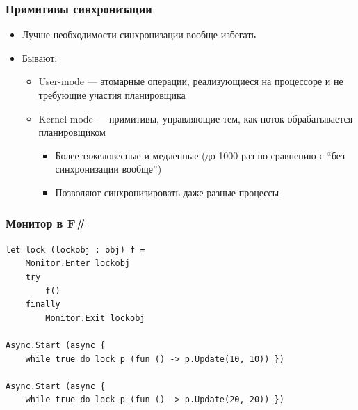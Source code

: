 \documentclass[xetex,mathserif,serif]{beamer}
\begin{document}
	\begin{frame}
		\frametitle{Примитивы синхронизации}
		\begin{itemize}
			\item Лучше необходимости синхронизации вообще избегать
			\item Бывают:
			\begin{itemize}
				\item User-mode --- атомарные операции, реализующиеся на процессоре и не требующие участия планировщика
				\item Kernel-mode --- примитивы, управляющие тем, как поток обрабатывается планировщиком
				\begin{itemize}
					\item Более тяжеловесные и медленные (до 1000 раз по сравнению с ``без синхронизации вообще'')
					\item Позволяют синхронизировать даже разные процессы
				\end{itemize}
			\end{itemize}
		\end{itemize}
	\end{frame}

	\begin{frame}[fragile]
		\frametitle{Монитор в F\#}
		\begin{verbatim}
let lock (lockobj : obj) f =
    Monitor.Enter lockobj
    try
        f()
    finally
        Monitor.Exit lockobj

Async.Start (async { 
    while true do lock p (fun () -> p.Update(10, 10)) })

Async.Start (async { 
    while true do lock p (fun () -> p.Update(20, 20)) })
		\end{verbatim}
	\end{frame}
\end{document}
